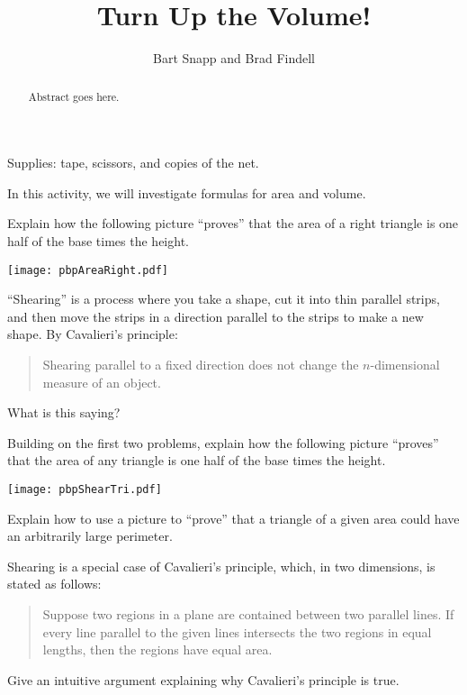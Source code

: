 \documentclass{ximera}
\title{Turn Up the Volume!}
\author{Bart Snapp and Brad Findell}
\begin{document}
\begin{abstract}
Abstract goes here.  
\end{abstract}
\maketitle

\begin{teachingnote}
Supplies: tape, scissors, and copies of the net.
\end{teachingnote}
In this activity, we will investigate formulas for area and
volume.


\begin{problem}
Explain how the following picture ``proves'' that the area of a right
  triangle is one half of the base times the height.
\begin{image}
\texttt{[image: pbpAreaRight.pdf]}
\end{image}
\end{problem}

\begin{problem}
``Shearing'' is a process where you take a shape, cut it into thin parallel strips, 
and then move the strips in a direction parallel to the strips to make a new shape.  
By Cavalieri's principle:
\begin{quote}
Shearing parallel to a fixed direction does not change the $n$-dimensional measure of an object.
\end{quote}
What is this saying?
\end{problem}

\begin{problem}
Building on the first two problems, explain how the following picture
  ``proves'' that the area of any triangle is one half of the base times the
  height.
\begin{image}
\texttt{[image: pbpShearTri.pdf]}
\end{image}
\end{problem}

\begin{problem}
Explain how to use a picture to ``prove'' that a triangle of a given
  area could have an arbitrarily large perimeter.
\end{problem}
\vspace{.25in}

\begin{problem}
Shearing is a special case of Cavalieri's principle, which, in two dimensions, is stated as follows:  
\begin{quote}
Suppose two regions in a plane are contained between two parallel lines.  If every line parallel to the given lines intersects the two regions in equal lengths, then the regions have equal area.  
\end{quote}
Give an intuitive argument explaining why Cavalieri's principle is true.
\end{problem}
\end{document}
